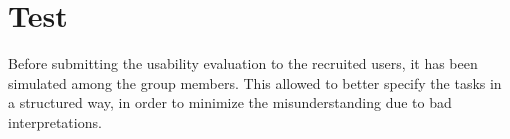 \documentclass[../../UsabilityReport.tex]{subfiles}
\begin{document}
\section{Test}
	Before submitting the usability evaluation to the recruited users, it has been simulated among the group members. This allowed to better specify the tasks in a structured way, in order to minimize the misunderstanding due to bad interpretations.
\end{document}
